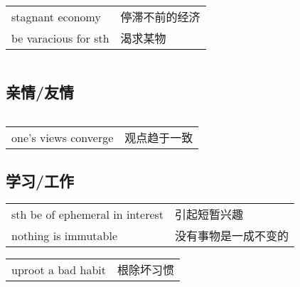 \begin{tabular}{ll}
    stagnant economy     & 停滞不前的经济 \\
    be varacious for sth & 渴求某物    \\
\end{tabular}

\begin{tabular}{ll}
\end{tabular}

\subsection{亲情/友情}

\begin{tabular}{ll}
\end{tabular}

\begin{tabular}{ll}
    one's views converge & 观点趋于一致 \\
\end{tabular}

\subsection{学习/工作}

\begin{tabular}{ll}
    sth be of ephemeral in interest & 引起短暂兴趣     \\
    nothing is immutable            & 没有事物是一成不变的 \\
\end{tabular}

\begin{tabular}{ll}
    uproot a bad habit & 根除坏习惯 \\
\end{tabular}
